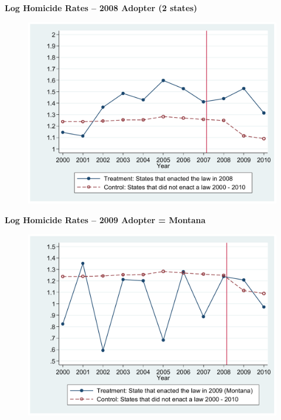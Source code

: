 \documentclass[notes=show]{beamer}
\begin{document}
\begin{frame}[plain]
	\begin{center}
	\textbf{Log Homicide Rates -- 2008 Adopter (2 states)}
	\end{center}
	
	\begin{figure}
	\includegraphics[scale=0.4]{./lecture_includes/cheng8.pdf}
	\end{figure}
\end{frame}


\begin{frame}[plain]
	\begin{center}
	\textbf{Log Homicide Rates -- 2009 Adopter = Montana}
	\end{center}
	
	\begin{figure}
	\includegraphics[scale=0.4]{./lecture_includes/cheng9.pdf}
	\end{figure}
\end{frame}
\end{document}
